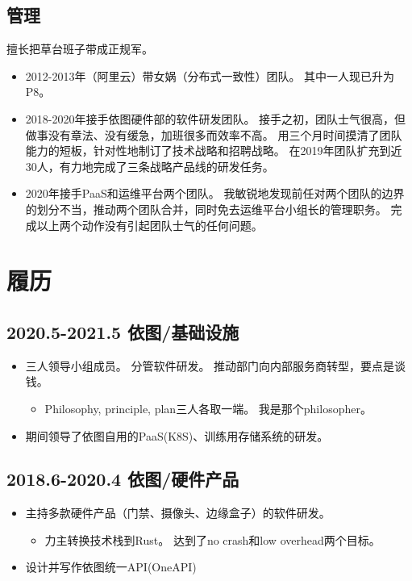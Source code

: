 \documentclass[scheme=plain]{ctexart}
\begin{document}
\subsection{管理}

擅长把草台班子带成正规军。
\begin{itemize}
    \item 2012-2013年（阿里云）带女娲（分布式一致性）团队。
        其中一人现已升为P8。
    \item 2018-2020年接手依图硬件部的软件研发团队。
        接手之初，团队士气很高，但做事没有章法、没有缓急，加班很多而效率不高。
        用三个月时间摸清了团队能力的短板，针对性地制订了技术战略和招聘战略。
        在2019年团队扩充到近30人，有力地完成了三条战略产品线的研发任务。
    \item 2020年接手PaaS和运维平台两个团队。
        我敏锐地发现前任对两个团队的边界的划分不当，推动两个团队合并，同时免去运维平台小组长的管理职务。
        完成以上两个动作没有引起团队士气的任何问题。
\end{itemize}


\section{履历}

\subsection*{2020.5-2021.5 依图/基础设施}

\begin{itemize}
    \item 三人领导小组成员。
        分管软件研发。
        推动部门向内部服务商转型，要点是谈钱。
        \begin{itemize}
            \item Philosophy, principle, plan三人各取一端。
                我是那个philosopher。
        \end{itemize}
    \item 期间领导了依图自用的PaaS(K8S)、训练用存储系统的研发。
\end{itemize}

\subsection*{2018.6-2020.4 依图/硬件产品}

\begin{itemize}
    \item 主持多款硬件产品（门禁、摄像头、边缘盒子）的软件研发。
        \begin{itemize}
            \item 力主转换技术栈到Rust。
                达到了no crash和low overhead两个目标。
        \end{itemize}
    \item 设计并写作依图统一API(OneAPI)
\end{itemize}
\end{document}
